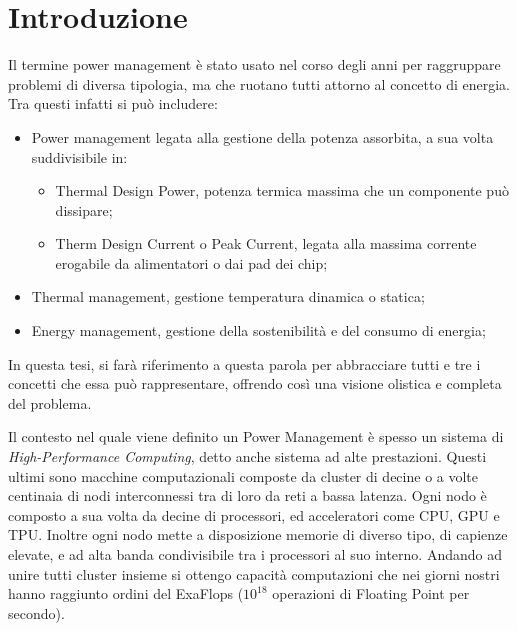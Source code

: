 \chapter{Introduzione}
Il termine power management è stato usato nel corso degli anni per raggruppare problemi di diversa tipologia, ma che ruotano tutti attorno al concetto di energia.
Tra questi infatti si può includere:
\begin{itemize}
    \item Power management legata alla gestione della potenza assorbita, a sua volta suddivisibile in:
    \begin{itemize}
        \item Thermal Design Power, potenza termica massima che un componente può dissipare;
        \item Therm Design Current o Peak Current, legata alla massima corrente erogabile da alimentatori o dai pad dei chip; %
    \end{itemize}
    \item Thermal management, gestione temperatura dinamica o statica;
    \item Energy management, gestione della sostenibilità e del consumo di energia;
\end{itemize}

In questa tesi, si farà riferimento a questa parola per abbracciare tutti e tre i concetti che essa può rappresentare, offrendo così una visione olistica e completa del problema.

Il contesto nel quale viene definito un Power Management è spesso un sistema di \emph{High-Performance Computing}, detto anche sistema ad alte prestazioni. Questi ultimi sono macchine computazionali composte da cluster di decine o a volte centinaia di nodi interconnessi tra di loro da reti a bassa latenza. Ogni nodo è composto a sua volta da decine di processori, ed acceleratori come CPU, GPU e TPU. %
Inoltre ogni nodo mette a disposizione memorie di diverso tipo, di capienze elevate, e ad alta banda condivisibile tra i processori al suo interno. Andando ad unire tutti cluster insieme si ottengo capacità computazioni che nei giorni nostri hanno raggiunto ordini del ExaFlops ($10^{18}$ operazioni di Floating Point per secondo). 

